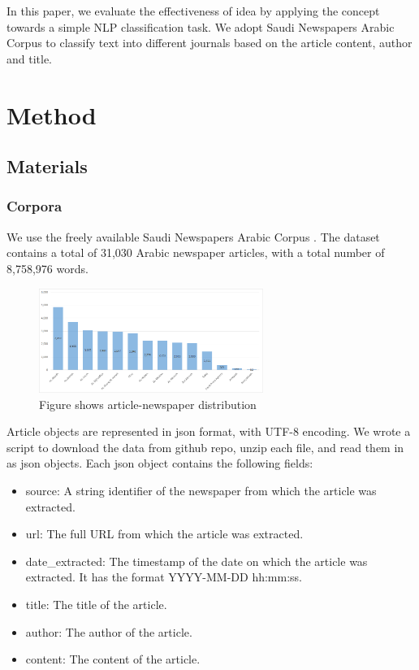 \documentclass[12pt]{article}
\begin{document}
In this paper, we evaluate the effectiveness of idea by applying the concept towards a simple NLP classification task. We adopt Saudi Newspapers Arabic Corpus \cite{hagrima2015} to classify text into different journals based on the article content, author and title.

\section{Method}\label{method}
\subsection{Materials}
\subsubsection{Corpora}
We use the freely available Saudi Newspapers Arabic Corpus \cite{hagrima2015}. The dataset contains a total of 31,030 Arabic newspaper articles, with a total number of 8,758,976 words. 

\begin{figure}[h!]
\centering
\includegraphics[width=0.65\textwidth]{figures/article-newspaper_distribution.png}
\caption{Figure shows article-newspaper distribution}
\end{figure}

Article objects are represented in json format, with UTF-8 encoding. We wrote a script to download the data from github repo, unzip each file, and read them in as json objects. Each json object contains the following fields:

\begin{itemize}
\item source: A string identifier of the newspaper from which the article was extracted.
\item url: The full URL from which the article was extracted.
\item date\_extracted: The timestamp of the date on which the article was extracted. It has the format YYYY-MM-DD hh:mm:ss. 
\item title: The title of the article. 
\item author: The author of the article.
\item content: The content of the article.
\end{itemize}
\end{document}

